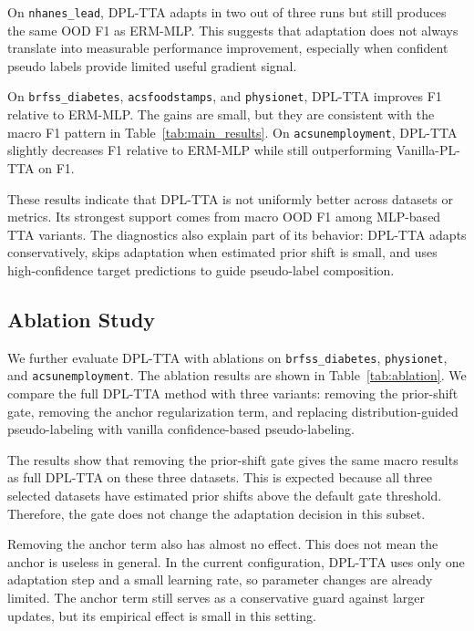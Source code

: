 \documentclass{article}
\begin{document}
On \texttt{nhanes\_lead}, DPL-TTA adapts in two out of three runs but still produces the same OOD F1 as ERM-MLP. This suggests that adaptation does not always translate into measurable performance improvement, especially when confident pseudo labels provide limited useful gradient signal.

On \texttt{brfss\_diabetes}, \texttt{acsfoodstamps}, and \texttt{physionet}, DPL-TTA improves F1 relative to ERM-MLP. The gains are small, but they are consistent with the macro F1 pattern in Table~\ref{tab:main_results}. On \texttt{acsunemployment}, DPL-TTA slightly decreases F1 relative to ERM-MLP while still outperforming Vanilla-PL-TTA on F1.

These results indicate that DPL-TTA is not uniformly better across datasets or metrics. Its strongest support comes from macro OOD F1 among MLP-based TTA variants. The diagnostics also explain part of its behavior: DPL-TTA adapts conservatively, skips adaptation when estimated prior shift is small, and uses high-confidence target predictions to guide pseudo-label composition.





\subsection{Ablation Study}

We further evaluate DPL-TTA with ablations on \texttt{brfss\_diabetes}, \texttt{physionet}, and \texttt{acsunemployment}. The ablation results are shown in Table~\ref{tab:ablation}. We compare the full DPL-TTA method with three variants: removing the prior-shift gate, removing the anchor regularization term, and replacing distribution-guided pseudo-labeling with vanilla confidence-based pseudo-labeling.

The results show that removing the prior-shift gate gives the same macro results as full DPL-TTA on these three datasets. This is expected because all three selected datasets have estimated prior shifts above the default gate threshold. Therefore, the gate does not change the adaptation decision in this subset.

Removing the anchor term also has almost no effect. This does not mean the anchor is useless in general. In the current configuration, DPL-TTA uses only one adaptation step and a small learning rate, so parameter changes are already limited. The anchor term still serves as a conservative guard against larger updates, but its empirical effect is small in this setting.
\end{document}
